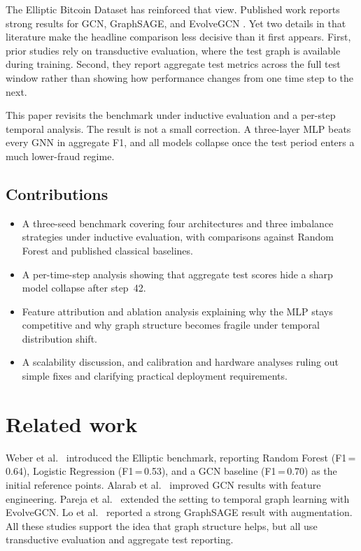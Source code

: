 \documentclass[runningheads]{llncs}
\begin{document}
The Elliptic Bitcoin Dataset \citep{weber2019} has reinforced that view.
Published work reports strong results for GCN, GraphSAGE, and EvolveGCN
\citep{weber2019,alarab2020,pareja2020evolvegcn,lo2023}. Yet two details in
that literature make the headline comparison less decisive than it first
appears. First, prior studies rely on transductive evaluation, where the test
graph is available during training. Second, they report aggregate test metrics
across the full test window rather than showing how performance changes from one
time step to the next.

This paper revisits the benchmark under inductive evaluation and a per-step
temporal analysis. The result is not a small correction. A three-layer MLP
beats every GNN in aggregate F1, and all models collapse once the test period
enters a much lower-fraud regime.

\subsection*{Contributions}
\begin{itemize}[leftmargin=*,nosep]
\item A three-seed benchmark covering four architectures and three imbalance
  strategies under inductive evaluation, with comparisons against Random
  Forest and published classical baselines.
\item A per-time-step analysis showing that aggregate test scores hide a
  sharp model collapse after step~42.
\item Feature attribution and ablation analysis explaining why the MLP
  stays competitive and why graph structure becomes fragile under
  temporal distribution shift.
\item A scalability discussion, and calibration and hardware analyses
  ruling out simple fixes and clarifying practical deployment requirements.
\end{itemize}

\section{Related work}

Weber et al.\ \citep{weber2019} introduced the Elliptic benchmark, reporting
Random Forest (F1\,=\,0.64), Logistic Regression (F1\,=\,0.53), and a GCN
baseline (F1\,=\,0.70) as the initial reference points. Alarab et al.\
\citep{alarab2020} improved GCN results with feature engineering. Pareja et al.\
\citep{pareja2020evolvegcn} extended the setting to temporal graph learning with
EvolveGCN. Lo et al.\ \citep{lo2023} reported a strong GraphSAGE result with
augmentation. All these studies support the idea that graph structure helps,
but all use transductive evaluation and aggregate test reporting.
\end{document}
